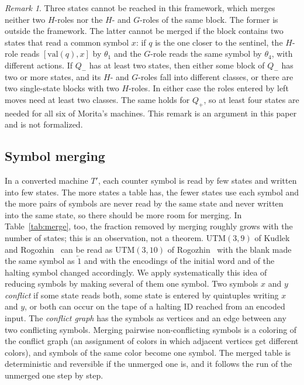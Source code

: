 \documentclass{article}
\theoremstyle{definition}
\theoremstyle{remark}
\newtheorem{remark}[theorem]{Remark}
\begin{document}
\begin{remark}
Three states cannot be reached in this framework, which merges neither two $H$-roles nor the $H$- and $G$-roles of the same block. The former is outside the framework. The latter cannot be merged if the block contains two states that read a common symbol $x$: if $q$ is the one closer to the sentinel, the $H$-role reads $[\mathrm{val}(q),x]$ by $\theta_1$ and the $G$-role reads the same symbol by $\theta_4$, with different actions.
If $Q_-$ has at least two states, then either some block of $Q_-$ has two or more states, and its $H$- and $G$-roles fall into different classes, or there are two single-state blocks with two $H$-roles.
In either case the roles entered by left moves need at least two classes.
The same holds for $Q_+$, so at least four states are needed for all six of Morita's machines.
This remark is an argument in this paper and is not formalized.
\end{remark}

\subsection{Symbol merging}
\label{sec:merge}

In a converted machine $T'$, each counter symbol is read by few states and written into few states. The more states a table has, the fewer states use each symbol and the more pairs of symbols are never read by the same state and never written into the same state, so there should be more room for merging. In Table~\ref{tab:merge}, too, the fraction removed by merging roughly grows with the number of states; this is an observation, not a theorem.
UTM$(3,9)$ of Kudlek and Rogozhin~\cite{KudlekRogozhin02} can be read as UTM$(3,10)$ of Rogozhin~\cite{Rogozhin96} with the blank made the same symbol as $\overleftarrow{1}$ and with the encodings of the initial word and of the halting symbol changed accordingly.
We apply systematically this idea of reducing symbols by making several of them one symbol.
Two symbols $x$ and $y$ \emph{conflict} if some state reads both, some state is entered by quintuples writing $x$ and $y$, or both can occur on the tape of a halting ID reached from an encoded input.
The \emph{conflict graph} has the symbols as vertices and an edge between any two conflicting symbols.
Merging pairwise non-conflicting symbols is a coloring of the conflict graph (an assignment of colors in which adjacent vertices get different colors), and symbols of the same color become one symbol.
The merged table is deterministic and reversible if the unmerged one is, and it follows the run of the unmerged one step by step.
\end{document}
